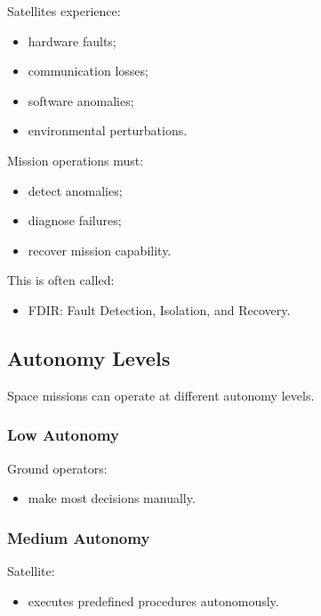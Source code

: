 \documentclass[10pt,a4paper,twocolumn]{article}
\begin{document}
Satellites experience:
\begin{itemize}
    \item hardware faults;
    \item communication losses;
    \item software anomalies;
    \item environmental perturbations.
\end{itemize}

Mission operations must:
\begin{itemize}
    \item detect anomalies;
    \item diagnose failures;
    \item recover mission capability.
\end{itemize}

This is often called:
\begin{itemize}
    \item FDIR:
          Fault Detection, Isolation, and Recovery.
\end{itemize}


\subsection{Autonomy Levels}

Space missions can operate at different autonomy levels.


\subsubsection*{Low Autonomy}

Ground operators:
\begin{itemize}
    \item make most decisions manually.
\end{itemize}


\subsubsection*{Medium Autonomy}

Satellite:
\begin{itemize}
    \item executes predefined procedures autonomously.
\end{itemize}
\end{document}
